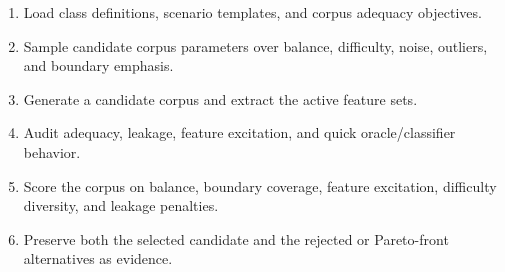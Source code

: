 \begin{enumerate}
  \item Load class definitions, scenario templates, and corpus adequacy objectives.
  \item Sample candidate corpus parameters over balance, difficulty, noise, outliers, and boundary emphasis.
  \item Generate a candidate corpus and extract the active feature sets.
  \item Audit adequacy, leakage, feature excitation, and quick oracle/classifier behavior.
  \item Score the corpus on balance, boundary coverage, feature excitation, difficulty diversity, and leakage penalties.
  \item Preserve both the selected candidate and the rejected or Pareto-front alternatives as evidence.
\end{enumerate}